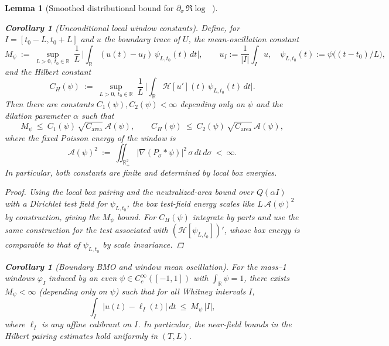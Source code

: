 \documentclass[11pt]{article}
\newtheorem{lemma}[theorem]{Lemma}
\newtheorem{corollary}[theorem]{Corollary}
\theoremstyle{definition}
\theoremstyle{remark}
\newcommand{\R}{\mathbb{R}}
\DeclareMathOperator{\dettwo}{det_2}
\begin{document}
\begin{lemma}[Smoothed distributional bound for $\partial_\sigma\,\Re\log\dettwo$]
\begin{corollary}[Unconditional local window constants]\label{cor:CH-Mpsi-final}
Define, for $I=[t_0-L,t_0+L]$ and $u$ the boundary trace of $U$, the mean-oscillation constant
\[
  M_\psi\ :=\ \sup_{L>0,\ t_0\in\R}\ \frac{1}{L}\,\Big|\int_{\R} (u(t)-u_I)\,\psi_{L,t_0}(t)\,dt\Big|,\qquad u_I:=\frac{1}{|I|}\int_I u,\quad \psi_{L,t_0}(t):=\psi\big((t-t_0)/L\big),
\]
and the Hilbert constant
\[
  C_H(\psi)\ :=\ \sup_{L>0,\ t_0\in\R}\ \frac{1}{L}\,\Big|\int_{\R} \mathcal H[u'](t)\,\psi_{L,t_0}(t)\,dt\Big|.
\]
Then there are constants $C_1(\psi),C_2(\psi)<\infty$ depending only on $\psi$ and the dilation parameter $\alpha$ such that
\[
  M_\psi\ \le\ C_1(\psi)\,\sqrt{C_{\mathrm{area}}}\,\mathcal A(\psi),\qquad
  C_H(\psi)\ \le\ C_2(\psi)\,\sqrt{C_{\mathrm{area}}}\,\mathcal A(\psi),
\]
where the fixed Poisson energy of the window is
\[
  \mathcal A(\psi)^2\ :=\ \iint_{\R^2_+}|\nabla(P_\sigma*\psi)|^2\,\sigma\,dt\,d\sigma\ <\ \infty.
\]
In particular, both constants are finite and determined by local box energies.
\end{corollary}

\begin{proof}
Using the local box pairing and the neutralized-area bound over $Q(\alpha I)$ with a Dirichlet test field for $\psi_{L,t_0}$, the box test-field energy scales like $L\,\mathcal A(\psi)^2$ by construction, giving the $M_\psi$ bound. For $C_H(\psi)$ integrate by parts and use the same construction for the test associated with $(\mathcal H[\psi_{L,t_0}])'$, whose box energy is comparable to that of $\psi_{L,t_0}$ by scale invariance.
\end{proof}

\begin{corollary}[Boundary BMO and window mean oscillation]\label{cor:bmo-boundary}
For the mass--1 windows $\varphi_I$ induced by an even $\psi\in C_c^\infty([-1,1])$ with $\int_\R\psi=1$, there exists $M_\psi<\infty$ (depending only on $\psi$) such that for all Whitney intervals $I$,
\[ \int_I |u(t)-\ell_I(t)|\,dt\ \le\ M_\psi\,|I|, \]
where $\ell_I$ is any affine calibrant on $I$. In particular, the near-field bounds in the Hilbert pairing estimates hold uniformly in $(T,L)$.
\end{corollary}


\end{lemma}
\end{document}
